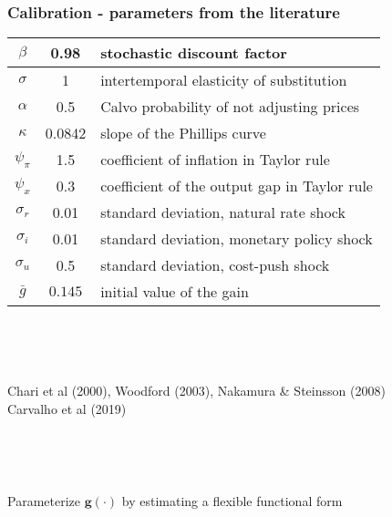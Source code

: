 \documentclass[10pt]{beamer}
\begin{document}
\begin{frame}
	\frametitle{Calibration - parameters from the literature}

\begin{center}
\begin{table}
\begin{tabular}{ c | c  | l }
\hline
 $\beta$ & 0.98 & stochastic discount factor \\  \hline
 $\sigma$ & 1  & intertemporal elasticity of substitution \\  \hline
 $\alpha$ & 0.5 &  Calvo probability of not adjusting prices \\\hline
 $\kappa$ & 0.0842 &  slope of the Phillips curve \\\hline
 $\psi_{\pi} $& 1.5  & coefficient of inflation in Taylor rule\\\hline
 $\psi_x$ & 0.3   & coefficient of the output gap in Taylor rule  \\\hline 
    $\sigma_r$ & 0.01 & standard deviation, natural rate shock  \\ \hline
    $\sigma_i$ &  0.01  &standard deviation, monetary policy shock  \\ \hline
    $\sigma_u$ & 0.5 & standard deviation, cost-push shock   \\ \hline  
 $\bar{g}$ & $0.145$  & initial value of the gain \\\hline 
   \end{tabular}     
   \label{calibration_lit}
 \end{table}
\end{center}

\

\

 Chari et al (2000), Woodford (2003), Nakamura \& Steinsson (2008) \\
 Carvalho et al (2019)

\

\

Parameterize $\mathbf{g}(\cdot)$ by estimating a flexible functional form \hfill \hyperlink{estimation_general}{}
 

\end{frame}
\end{document}
